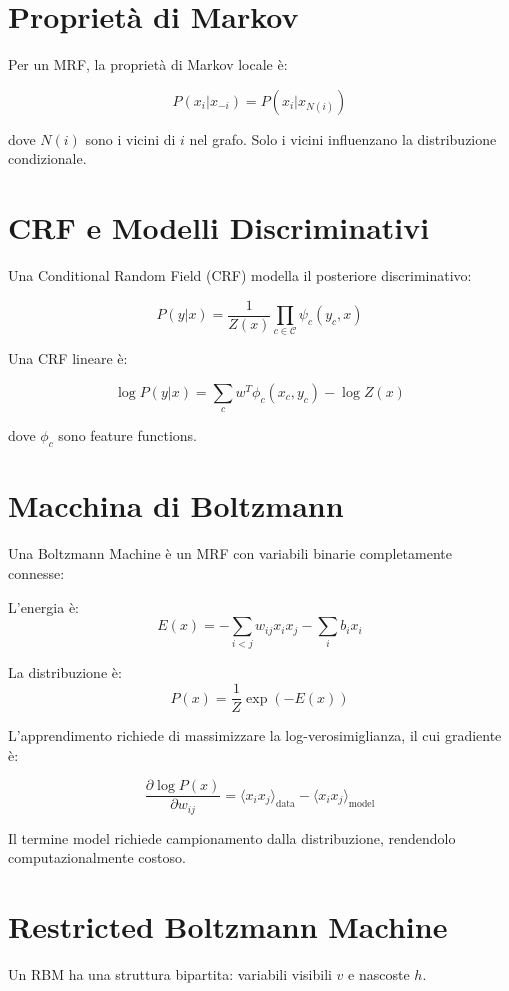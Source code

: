 \section{Proprietà di Markov}

Per un MRF, la proprietà di Markov locale è:

\[P(x_i | x_{-i}) = P(x_i | x_{N(i)})\]

dove $N(i)$ sono i vicini di $i$ nel grafo. Solo i vicini influenzano la distribuzione condizionale.

\section{CRF e Modelli Discriminativi}

Una Conditional Random Field (CRF) modella il posteriore discriminativo:

\[P(y|x) = \frac{1}{Z(x)} \prod_{c \in \mathcal{C}} \psi_c(y_c, x)\]

Una CRF lineare è:

\[\log P(y|x) = \sum_c w^T \phi_c(x_c, y_c) - \log Z(x)\]

dove $\phi_c$ sono feature functions.

\section{Macchina di Boltzmann}

Una Boltzmann Machine è un MRF con variabili binarie completamente connesse:

\begin{definition}
  L'energia è:
  \[E(x) = -\sum_{i<j} w_{ij} x_i x_j - \sum_i b_i x_i\]

  La distribuzione è:
  \[P(x) = \frac{1}{Z} \exp(-E(x))\]
\end{definition}

L'apprendimento richiede di massimizzare la log-verosimiglianza, il cui gradiente è:

\[\frac{\partial \log P(x)}{\partial w_{ij}} = \langle x_i x_j \rangle_{\text{data}} - \langle x_i x_j \rangle_{\text{model}}\]

Il termine model richiede campionamento dalla distribuzione, rendendolo computazionalmente costoso.

\section{Restricted Boltzmann Machine}

Un RBM ha una struttura bipartita: variabili visibili $v$ e nascoste $h$.

